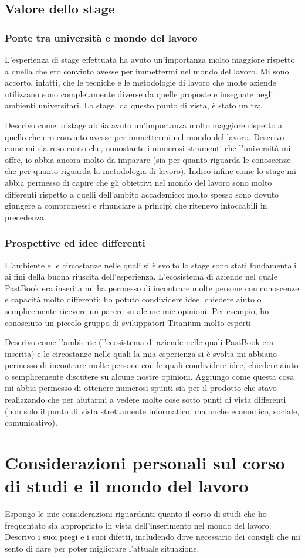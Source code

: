 		\subsection{Valore dello stage}
			\subsubsection{Ponte tra università e mondo del lavoro}
				L'esperienza di stage effettuata ha avuto un'importanza molto maggiore rispetto a quella che ero convinto avesse per
				immettermi nel mondo del lavoro. Mi sono accorto, infatti, che le tecniche e le metodologie di lavoro che molte
				aziende utilizzano sono completamente diverse da quelle proposte e insegnate negli ambienti universitari. Lo stage,
				da questo punto di vista, è stato un tra
				
				Descrivo come lo stage abbia avuto un'importanza molto maggiore rispetto a quello che ero convinto avesse per
				immettermi nel mondo del lavoro. Descrivo come mi sia reso conto che, nonostante i numerosi strumenti che
				l'università mi offre, io abbia ancora molto da imparare (sia per quanto riguarda le conoscenze che per quanto
				riguarda la metodologia di lavoro). Indico infine come lo stage mi abbia permesso di capire che gli obiettivi nel
				mondo del lavoro sono molto differenti rispetto a quelli dell'ambito accademico: molto spesso sono dovuto giungere
				a compromessi e rinunciare a principi che ritenevo intoccabili in precedenza.
			\subsubsection{Prospettive ed idee differenti}
				L'ambiente e le circostanze nelle quali si è svolto lo stage sono stati fondamentali ai fini della buona riuscita
				dell'esperienza. L'ecosistema di aziende nel quale PastBook era inserita mi ha permesso di incontrare molte persone
				con conoscenze e capacità molto differenti: ho potuto condividere idee, chiedere aiuto o semplicemente ricevere un
				parere su alcune mie opinioni. Per esempio, ho conosciuto un piccolo gruppo di sviluppatori Titanium molto esperti
			
				Descrivo come l'ambiente (l'ecosistema di aziende nelle quali PastBook era inserita) e le circostanze nelle quali la
				mia esperienza si è svolta mi abbiano permesso di incontrare molte persone con le quali condividere idee, chiedere
				aiuto o semplicemente discutere su alcune nostre opinioni. Aggiungo come questa cosa mi abbia permesso di ottenere
				numerosi spunti sia per il prodotto che stavo realizzando che per aiutarmi a vedere molte cose sotto punti di vista
				differenti (non solo il punto di vista strettamente informatico, ma anche economico, sociale, comunicativo).
	\section{Considerazioni personali sul corso di studi e il mondo del lavoro}
		Espongo le mie considerazioni riguardanti quanto il corso di studi che ho frequentato sia appropriato in vista dell'inserimento
		nel mondo del lavoro. Descrivo i suoi pregi e i suoi difetti, includendo dove necessario dei consigli che mi sento di dare per
		poter migliorare l'attuale situazione.

